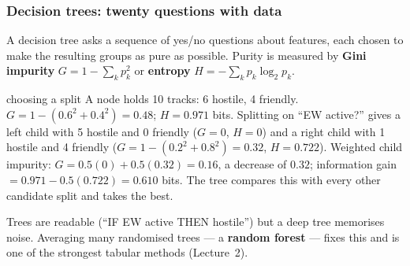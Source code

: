 \documentclass[11pt]{article}
\begin{document}
\subsubsection{Decision trees: twenty questions with data}
A decision tree asks a sequence of yes/no questions about features, each chosen to make the resulting groups as pure as possible. Purity is measured by \textbf{Gini impurity} $G=1-\sum_kp_k^2$ or \textbf{entropy} $H=-\sum_kp_k\log_2p_k$.
\begin{example}{choosing a split}
A node holds 10 tracks: 6 hostile, 4 friendly. $G=1-(0.6^2+0.4^2)=0.48$; $H=0.971$ bits. Splitting on ``EW active?'' gives a left child with 5 hostile and 0 friendly ($G=0$, $H=0$) and a right child with 1 hostile and 4 friendly ($G=1-(0.2^2+0.8^2)=0.32$, $H=0.722$). Weighted child impurity: $G=0.5(0)+0.5(0.32)=0.16$, a decrease of $0.32$; information gain $=0.971-0.5(0.722)=0.610$ bits. The tree compares this with every other candidate split and takes the best.
\end{example}
Trees are readable (``IF EW active THEN hostile'') but a deep tree memorises noise. Averaging many randomised trees --- a \textbf{random forest} --- fixes this and is one of the strongest tabular methods (Lecture~2).
\end{document}
